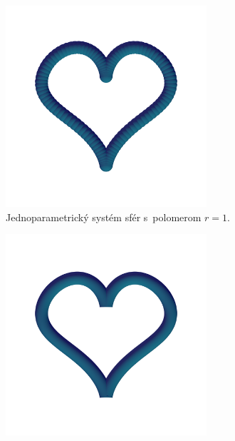 \documentclass[12pt, twoside]{book}
\begin{document}
\begin{figure}[h]
    \centering
    \captionsetup{justification=centering}
	\captionsetup[subfigure]{justification=centering}
    \begin{subfigure}[t]{0.49\textwidth}
        \centering
        \includegraphics[width=0.82\textwidth, trim=0mm 100mm 0mm 50mm, clip=true]{images/heart_spheres.png}
        	\caption{Jednoparametrický systém sfér s~polomerom $r=1$.}
        \label{fig:plocha11}
    \end{subfigure}
    \hfill
    \begin{subfigure}[t]{0.49\textwidth}
        \centering
        \includegraphics[width=0.82\textwidth, trim=0mm 100mm 0mm 50mm, clip=true]{images/heart_spheres_envelope.png}

\end{subfigure}
\end{figure}
\end{document}
